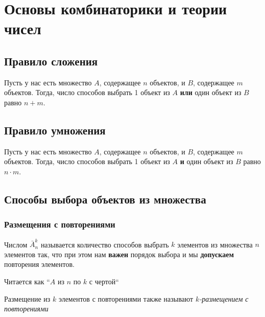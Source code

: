 \section{Основы комбинаторики и теории чисел}

\subsection{Правило сложения}

\begin{proposition}
	Пусть у нас есть множество $A$, содержащее $n$ объектов, и $B$, содержащее $m$ объектов. Тогда, число способов выбрать 1 объект из $A$ \textbf{или} один объект из $B$ равно $n + m$.
\end{proposition}

\subsection{Правило умножения}

\begin{proposition}
	Пусть у нас есть множество $A$, содержащее $n$ объектов, и $B$, содержащее $m$ объектов. Тогда, число способов выбрать 1 объект из $A$ \textbf{и} один объект из $B$ равно $n \cdot m$.
\end{proposition}

\subsection{Способы выбора объектов из множества}

\subsubsection*{Размещения с повторениями}

\begin{definition}
	Числом $\bar{A}_n^k$ называется количество способов выбрать $k$ элементов из множества $n$ элементов так, что при этом нам \textbf{важен} порядок выбора и мы \textbf{допускаем} повторения элементов.
\end{definition}

\begin{note}
	Читается как ``$A$ из $n$ по $k$ с чертой``
\end{note}

\begin{note}
	Размещение из $k$ элементов с повторениями также называют \textit{$k$-размещением с повторениями}
\end{note}

